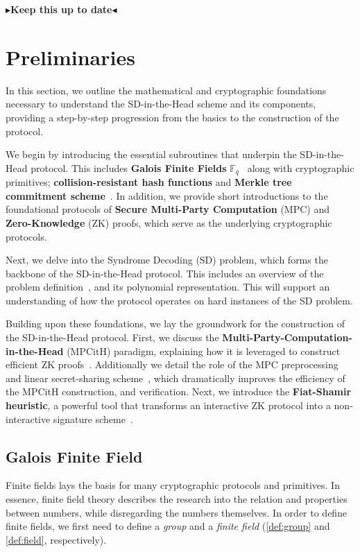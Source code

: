 \documentclass[twoside,11pt]{report}
\theoremstyle{definition}
\theoremstyle{plain}
\newcommand{\todo}[1]{{\color[rgb]{.5,0,0}\textbf{$\blacktriangleright$#1$\blacktriangleleft$}}}
\begin{document}
\todo{Keep this up to date}


\chapter{Preliminaries}\label{ch:prelim}

In this section, we outline the mathematical and cryptographic foundations necessary to understand the SD-in-the-Head scheme and its components, providing a step-by-step progression from the basics to the construction of the protocol.

We begin by introducing the essential subroutines that underpin the SD-in-the-Head protocol. This includes \textbf{Galois Finite Fields} $\mathbb{F}_q$~\cite{martinez2023syndromes, reed1960polynomial, brownadvanced} along with cryptographic primitives; \textbf{collision-resistant hash functions} and \textbf{Merkle tree commitment scheme}~\cite{becker2008merkle}. In addition, we provide short introductions to the foundational protocols of \textbf{Secure Multi-Party Computation} (MPC) and \textbf{Zero-Knowledge} (ZK) proofs, which serve as the underlying cryptographic protocols.

Next, we delve into the Syndrome Decoding (SD) problem, which forms the backbone of the SD-in-the-Head protocol. This includes an overview of the problem definition~\cite{aguilarsyndrome11, mceliece1978public, berlekamp1978inherent, baldi2013optimization}, and its polynomial representation. This will support an understanding of how the protocol operates on hard instances of the SD problem.

Building upon these foundations, we lay the groundwork for the construction of the SD-in-the-Head protocol. First, we discuss the \textbf{Multi-Party-Computation-in-the-Head} (MPCitH) paradigm, explaining how it is leveraged to construct efficient ZK proofs~\cite{ishai2007zero}. Additionally we detail the role of the MPC preprocessing~\cite{baum2020concretely} and linear secret-sharing scheme~\cite{feneuil2023threshold}, which dramatically improves the efficiency of the MPCitH construction, and verification. Next, we introduce the \textbf{Fiat-Shamir heuristic}, a powerful tool that transforms an interactive ZK protocol into a non-interactive signature scheme~\cite{fiat1986prove}.

\section{Galois Finite Field}\label{sec:gf256}
Finite fields lays the basis for many cryptographic protocols and primitives. In essence, finite field theory describes the research into the relation and properties between numbers, while disregarding the numbers themselves. In order to define finite fields, we first need to define a \textit{group} and a \textit{finite field} (\autoref{def:group} and \autoref{def:field}, respectively).
\end{document}
